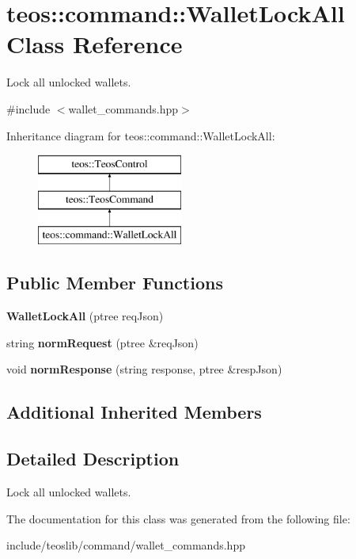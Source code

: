 \hypertarget{classteos_1_1command_1_1_wallet_lock_all}{}\section{teos\+:\+:command\+:\+:Wallet\+Lock\+All Class Reference}
\label{classteos_1_1command_1_1_wallet_lock_all}


Lock all unlocked wallets.  




{\ttfamily \#include $<$wallet\+\_\+commands.\+hpp$>$}

Inheritance diagram for teos\+:\+:command\+:\+:Wallet\+Lock\+All\+:\begin{figure}[H]
\begin{center}
\leavevmode
\includegraphics[height=3.000000cm]{classteos_1_1command_1_1_wallet_lock_all}
\end{center}
\end{figure}
\subsection*{Public Member Functions}
\begin{DoxyCompactItemize}
\item 
\mbox{\label{classteos_1_1command_1_1_wallet_lock_all_aaf4e6b212639281d2a5008a0ae798441}} 
{\bfseries Wallet\+Lock\+All} (ptree req\+Json)
\item 
\mbox{\label{classteos_1_1command_1_1_wallet_lock_all_a03ad4d17f33bec997d3c4d6ff67ea92a}} 
string {\bfseries norm\+Request} (ptree \&req\+Json)
\item 
\mbox{\label{classteos_1_1command_1_1_wallet_lock_all_abc6a2eb5f15f0f2e95b34ceb3f12339e}} 
void {\bfseries norm\+Response} (string response, ptree \&resp\+Json)
\end{DoxyCompactItemize}
\subsection*{Additional Inherited Members}


\subsection{Detailed Description}
Lock all unlocked wallets. 

The documentation for this class was generated from the following file\+:\begin{DoxyCompactItemize}
\item 
include/teoslib/command/wallet\+\_\+commands.\+hpp\end{DoxyCompactItemize}
